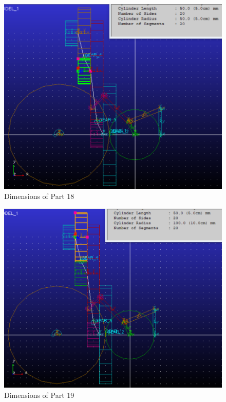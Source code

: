                 \begin{figure}[hbt!]
                    \centering
                    \includegraphics[width=0.9\columnwidth]{Images/dim18.png}
                    \caption{Dimensions of Part 18}
                    \label{fig:dim18}
                \end{figure}

                \begin{figure}[hbt!]
                    \centering
                    \includegraphics[width=0.9\columnwidth]{Images/dim19.png}
                    \caption{Dimensions of Part 19}
                    \label{fig:dim19}
                \end{figure}

